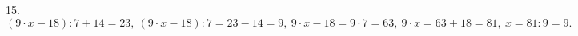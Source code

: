 15. $(9\cdot x-18):7+14=23,\ (9\cdot x-18):7=23-14=9,\ 9\cdot x-18=9\cdot7=63,\ 9\cdot x=63+18=81,\ x=81:9=9.$\\
